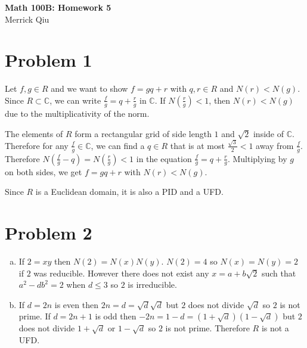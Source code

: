 \documentclass{article}
\begin{document}
\begin{center}
	\huge{\bf Math 100B: Homework 5} \\
	Merrick Qiu
\end{center}

\section*{Problem 1}
Let $f, g \in R$ and we want to show $f = g q + r$ with $q, r \in R$
and $N(r) < N(g)$.
Since $R \subset \mathbb{C}$, we can write 
$\frac{f}{g} = q + \frac{r}{g}$ in $\mathbb{C}$.
If $N(\frac{r}{g}) < 1$, then $N(r) < N(g)$ due to the
multiplicativity of the norm.

The elements of $R$ form a rectangular grid of side length $1$ and 
$\sqrt{2}$ inside of $\mathbb{C}$.
Therefore for any $\frac{f}{g} \in \mathbb{C}$, we can find a $q \in R$
that is at most $\frac{\sqrt{3}}{2} < 1$ away from $\frac{f}{g}$.
Therefore $N(\frac{f}{g} - q) = N(\frac{r}{g}) < 1$ in the equation
$\frac{f}{g} = q + \frac{r}{g}$.
Multiplying by $g$ on both sides, we get $f = gq + r$ with $N(r) < N(g)$.

Since $R$ is a Euclidean domain, it is also a PID and a UFD.
\newpage 

\section*{Problem 2}
\begin{enumerate}[(a)]
	\item If $2 = xy$ then $N(2) = N(x)N(y)$.
		$N(2) = 4$ so  $N(x) = N(y) = 2$ if $2$ was reducible.
		However there does not exist any $x = a+b\sqrt{2}$ such that $a^2 - db^2 = 2$ when $d \leq 3$
		so $2$ is irreducible.
	\item If  $d =2n$ is even then $2n = d = \sqrt{d}\sqrt{d}$ but $2$ does not divide $\sqrt{d}$ so $2$ is not prime.
		If $d = 2n+1$ is odd then $-2n = 1-d =(1+\sqrt{d})(1-\sqrt{d})$ but $2$ does not divide $1+\sqrt{d}$ or $1-\sqrt{d}$ so $2$ is not prime.
		Therefore $R$ is not a UFD.
\end{enumerate}
\newpage 
\end{document}
